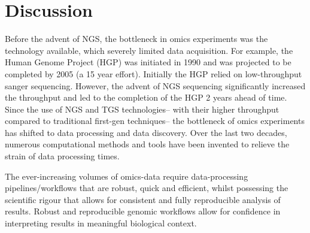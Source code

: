 \afterpage{\clearpage}




\section{Discussion}

Before the advent of NGS, the bottleneck in omics experiments was the technology available, which severely limited data acquisition.
For example, the Human Genome Project (HGP) was initiated in 1990 and was projected to be completed by 2005 (a 15 year effort).
Initially the HGP relied on low-throughput sanger sequencing.
However, the advent of NGS sequencing significantly increased the throughput and led to the completion of the HGP 2 years ahead of time.
Since the use of NGS and TGS technologies-- with their higher throughput compared to traditional first-gen techniques-- the bottleneck of omics experiments has shifted to data processing and data discovery.
Over the last two decades, numerous computational methods and tools have been invented to relieve the strain of data processing times.

The ever-increasing volumes of omics-data require data-processing pipelines/workflows that are robust, quick and efficient, whilst possessing the scientific rigour that allows for consistent and fully reproducible analysis of results.
Robust and reproducible genomic workflows allow for confidence in interpreting results in meaningful biological context.


